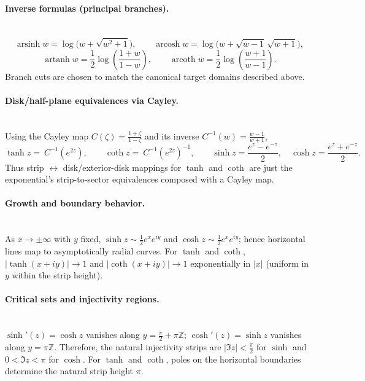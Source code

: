 \documentclass[11pt]{article}
\begin{document}
\paragraph{Inverse formulas (principal branches).}\mbox{}\\[2pt]
\[
\operatorname{arsinh} w=\log\!\big(w+\sqrt{w^{2}+1}\big),\qquad
\operatorname{arcosh} w=\log\!\big(w+\sqrt{w-1}\,\sqrt{w+1}\big),
\]
\[
\operatorname{artanh} w=\frac12\log\!\left(\frac{1+w}{1-w}\right),\qquad
\operatorname{arcoth} w=\frac12\log\!\left(\frac{w+1}{w-1}\right).
\]
Branch cuts are chosen to match the canonical target domains described above.

\medskip

\paragraph{Disk/half-plane equivalences via Cayley.}\mbox{}\\[2pt]
Using the Cayley map $C(\zeta)=\frac{1+\zeta}{1-\zeta}$ and its inverse $C^{-1}(w)=\frac{w-1}{w+1}$,
\[
\tanh z=\ C^{-1}\!\left(e^{2z}\right),\qquad
\coth z=\ C^{-1}\!\left(e^{2z}\right)^{-1},\qquad
\sinh z=\frac{e^{z}-e^{-z}}{2},\quad \cosh z=\frac{e^{z}+e^{-z}}{2}.
\]
Thus strip $\leftrightarrow$ disk/exterior-disk mappings for $\tanh$ and $\coth$ are just the exponential’s strip-to-sector equivalences composed with a Cayley map.

\medskip

\paragraph{Growth and boundary behavior.}\mbox{}\\[2pt]
As $x\to\pm\infty$ with $y$ fixed, $\sinh z\sim \frac12 e^{x}e^{iy}$ and $\cosh z\sim \frac12 e^{x}e^{iy}$; hence horizontal lines map to asymptotically radial curves. For $\tanh$ and $\coth$, $|\tanh(x+iy)|\to 1$ and $|\coth(x+iy)|\to 1$ exponentially in $|x|$ (uniform in $y$ within the strip height).

\medskip

\paragraph{Critical sets and injectivity regions.}\mbox{}\\[2pt]
$\sinh'(z)=\cosh z$ vanishes along $y=\frac{\pi}{2}+\pi\mathbb Z$; $\cosh'(z)=\sinh z$ vanishes along $y=\pi\mathbb Z$.
Therefore, the natural injectivity strips are $|\Im z|<\tfrac{\pi}{2}$ for $\sinh$ and $0<\Im z<\pi$ for $\cosh$.
For $\tanh$ and $\coth$, poles on the horizontal boundaries determine the natural strip height $\pi$.
\end{document}
